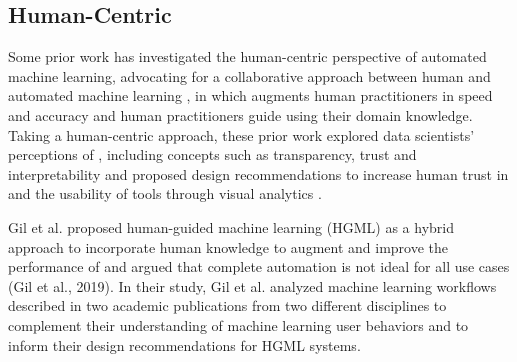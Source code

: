 


\subsection{Human-Centric \automl}
Some prior work has investigated the human-centric perspective of automated machine learning, advocating for a collaborative approach between human and automated machine learning \cite{Lee2019AHP,wang2018atmseer, gilHGML}, in which \automl augments human practitioners in speed and accuracy and human practitioners guide \automl using their domain knowledge. Taking a human-centric approach, these prior work explored data scientists' perceptions of  \automl, including concepts such as transparency, trust and interpretability and proposed design recommendations to increase human trust in \automl and the usability of tools through visual analytics \cite{wang2018atmseer, cashman et al snowcast}.   

Gil et al. proposed human-guided machine learning (HGML) as a hybrid approach to incorporate human knowledge to augment and improve the performance of \automl and argued that complete automation is not ideal for all use cases (Gil et al., 2019). In their study, Gil et al. analyzed machine learning workflows described in two academic publications from two different disciplines to complement their understanding of machine learning user behaviors and to inform their design recommendations for HGML systems.

